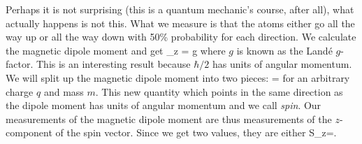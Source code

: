 Perhaps it is not surprising (this is a quantum mechanic's course, after all), what actually happens is not this. What we measure is that the atoms either go all the way up or all the way down with 50\% probability for each direction. We calculate the magnetic dipole moment and get
\beq
\mu_z = \pm g 
\eeq
where $g$ is known as the Land\'{e} $g$-factor.  This is an interesting result because $\hbar/2$ has units of angular momentum. We will split up the magnetic dipole moment into two pieces:
\beq
\vec{\mu} = 
\label{eq:dipolespin}
\eeq
for an arbitrary charge $q$ and mass $m$. This new quantity which points in the same direction as the dipole moment has units of angular momentum and we call {\em spin}. Our measurements of the magnetic dipole moment are thus measurements of the $z$-component of the spin vector. Since we get two values, they are either
\beq
S_z=\pm{}.
\eeq


